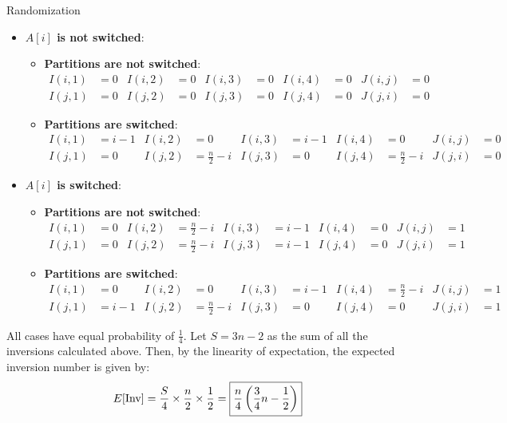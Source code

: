 \documentclass{article}
\begin{document}
\begin{section}{Randomization}
\begin{enumerate}
    \begin{itemize}
        \item {\bf $A[i]$ is not switched}:
        \begin{itemize}
            \item {\bf Partitions are not switched}:
                \begin{align*}
                    I(i, 1) &= 0 & I(i, 2) &= 0 & I(i, 3) &= 0 & I(i, 4) &= 0 & J(i, j) &= 0\\
                    I(j, 1) &= 0 & I(j, 2) &= 0 & I(j, 3) &= 0 & I(j, 4) &= 0 & J(j, i) &= 0
                \end{align*}
            \item {\bf Partitions are switched}:
                \begin{align*}
                    I(i, 1) &= i-1 & I(i, 2) &= 0 & I(i, 3) &= i-1 & I(i, 4) &= 0 & J(i, j) &= 0 \\
                    I(j, 1) &= 0 & I(j, 2) &= \frac{n}{2}-i & I(j, 3) &= 0 & I(j, 4) &= \frac{n}{2}-i & J(j, i) &= 0
                \end{align*}
        \end{itemize}
        \item {\bf $A[i]$ is switched}:
        \begin{itemize}
            \item {\bf Partitions are not switched}:
                \begin{align*}
                    I(i, 1) &= 0 & I(i, 2) &= \frac{n}{2}-i & I(i, 3) &= i-1 & I(i, 4) &= 0 & J(i, j) &= 1 \\
                    I(j, 1) &= 0 & I(j, 2) &= \frac{n}{2}-i & I(j, 3) &= i-1 & I(j, 4) &= 0 & J(j, i) &= 1
                \end{align*}
            \item {\bf Partitions are switched}:
                \begin{align*}
                    I(i, 1) &= 0 & I(i, 2) &= 0 & I(i, 3) &= i-1 & I(i, 4) &= \frac{n}{2}-i & J(i, j) &= 1 \\
                    I(j, 1) &= i-1 & I(j, 2) &= \frac{n}{2}-i & I(j, 3) &= 0 & I(j, 4) &= 0 & J(j, i) &= 1
                \end{align*}
        \end{itemize}
    \end{itemize}
    All cases have equal probability of $\frac{1}{4}$. Let $S = 3n-2$ as the sum of all the inversions calculated above. Then, by the linearity of expectation, the expected inversion number is given by:
    \begin{align*}
        E[\text{Inv}] = \frac{S}{4} \times \frac{n}{2} \times \frac{1}{2} = \boxed{\frac{n}{4} \left(\frac{3}{4}n - \frac{1}{2}\right)}
    \end{align*}
    

\end{enumerate}
\end{section}
\end{document}
